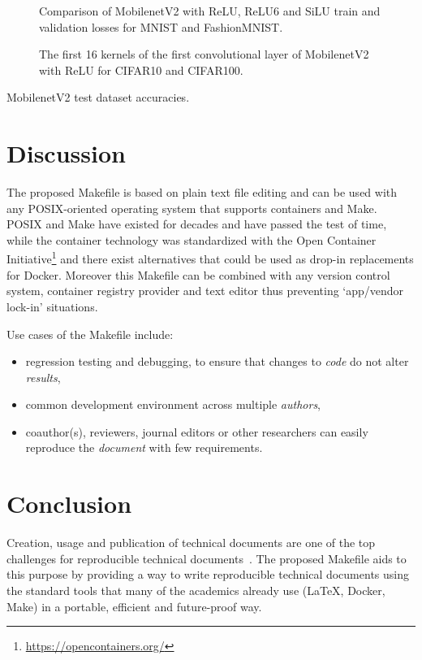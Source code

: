 \documentclass[journal]{IEEEtran}
\begin{document}
\begin{figure}[!t]
	\caption{Comparison of MobilenetV2 with ReLU, ReLU6 and SiLU train and validation losses for MNIST and FashionMNIST.}
	\label{fig:loss}
\end{figure}

\begin{figure}[!t]
	\caption{The first 16 kernels of the first convolutional layer of MobilenetV2 with ReLU for CIFAR10 and CIFAR100.}
	\label{fig:kernels}
\end{figure}

\begin{table}[h]
	\centering
	\caption{MobilenetV2 test dataset accuracies.}
	\label{table:table}
	\setlength\tabcolsep{4pt}
	
\end{table}

\section{Discussion}
The proposed Makefile is based on plain text file editing and can be used with any POSIX-oriented operating system that supports containers and Make.
POSIX and Make have existed for decades and have passed the test of time, while the container technology was standardized with the Open Container Initiative\footnote{\url{https://opencontainers.org/}} and there exist alternatives that could be used as drop-in replacements for Docker.
Moreover this Makefile can be combined with any version control system, container registry provider and text editor thus preventing `app/vendor lock-in' situations.

Use cases of the Makefile include:
\begin{itemize}
	\item regression testing and debugging, to ensure that changes to \textit{code} do not alter \textit{results},
	\item common development environment across multiple \textit{authors},
	\item coauthor(s), reviewers, journal editors or other researchers can easily reproduce the \textit{document} with few requirements.
\end{itemize}

\section{Conclusion}
Creation, usage and publication of technical documents are one of the top challenges for reproducible technical documents~\cite{barba2019praxis}.
The proposed Makefile aids to this purpose by providing a way to write reproducible technical documents using the standard tools that many of the academics already use (\LaTeX, Docker, Make) in a portable, efficient and future-proof way.



\end{document}
